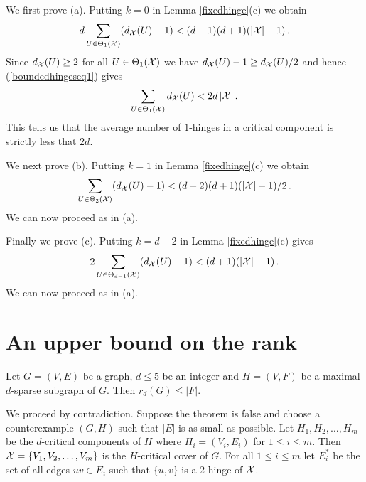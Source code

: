 \documentclass[11pt]{article}
\begin{document}
We first prove (a). Putting $k=0$ in Lemma \ref{fixedhinge}(c) we
obtain
\begin{equation}\label{boundedhingeseq1}
d\sum_{U\in\Theta_{1}(\calx)}(d_\calx(U)-1)
<(d-1)(d+1)(|\calx|-1)\,.
\end{equation}
Since $d_\calx(U)\geq 2$ for all $U\in\Theta_{1}({\cal X})$ we have
$d_\calx(U)-1\geq d_\calx(U)/2$ and hence (\ref{boundedhingeseq1})
gives
$$\sum_{U\in\Theta_{1}({\cal X})}d_{\cal X}(U)
<2d\,|{\cal X}|\,.
$$
This tells us that the average number of $1$-hinges in a critical
component is strictly less that $2d$.


We next prove (b). Putting $k=1$ in Lemma \ref{fixedhinge}(c) we
obtain
\begin{equation}\label{boundedhingeseq1.5}
\sum_{U\in\Theta_{2}(\calx)}(d_\calx(U)-1)
<(d-2)(d+1)(|\calx|-1)/2\,.
\end{equation}
We can now proceed as in (a).

\iffalse

We next prove (c). Putting $k=1$ in Lemma \ref{fixedhinge}(d) we
obtain
\begin{equation}\label{boundedhingeseq2}
d(d-2)\sum_{U\in\Theta_{1}(\calx)}(d_\calx(U)-1)+2\sum_{U\in\Theta_{2}(\calx)}(d_\calx(U)-1)
<d(d-2)(d+1)(|\calx|-1)\,.
\end{equation}
Since $d_\calx(U)\geq 2$  we have $d_\calx(U)-1\geq d_\calx(U)/2$
for all $U\in\Theta_{1}(\calx)\cup \Theta_{2}(\calx)$ and hence
(\ref{boundedhingeseq2}) gives
$$d(d-2)\sum_{U\in\Theta_{1}(\calx)}d_\calx(U)+2\sum_{U\in\Theta_{2}(\calx)}d_\calx(U)
<2d(d-2)(d+1)|\calx|\,.
$$
This tells us that the average value of
$d(d-2)\theta_{1}(H_i)+2\theta_{2}(H_i)$ over all critical
components $H_i$ of $H$ is strictly less that $2d(d-2)(d+1)$.

\fi

Finally we prove (c). Putting $k=d-2$ in Lemma \ref{fixedhinge}(c)
gives
\begin{equation}\label{boundedhingeseq3}
2\sum_{U\in\Theta_{d-1}(\calx)}(d_\calx(U)-1) <(d+1)(|\calx|-1)\,.
\end{equation}
We can now proceed as in (a).

\section{An upper bound on the rank}
\begin{theorem}\label{upperbound}
Let $G=(V,E)$ be a graph, $d\leq 5$ be an integer and $H=(V,F)$ be a
maximal $d$-sparse subgraph of $G$.  Then $r_d(G)\leq |F|$.
\end{theorem}
\bproof We proceed by contradiction. Suppose the theorem is false
and choose a counterexample $(G,H)$ such that $|E|$ is as small as
possible. Let $H_1,H_2,\ldots,H_m$ be the $d$-critical components of
$H$ where $H_i=(V_i,E_i)$ for $1\leq i\leq m$. Then
${\cal X}=\{V_1,V_2,\ldots,V_m\}$ is the $H$-critical cover of $G$. For
all $1\leq i \leq m$ let $E_i^*$ be the set of all edges $uv\in E_i$
such that $\{u,v\}$ is a 2-hinge of ${\cal X}$.
\end{document}
